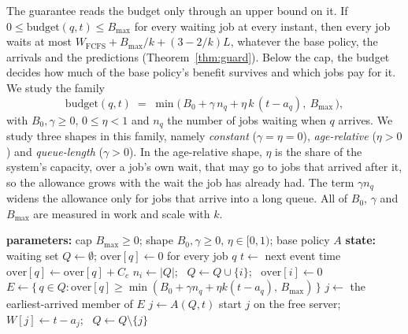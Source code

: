 The guarantee reads the budget only through an upper bound on it. If
$0 \le \mathrm{budget}(q,t) \le B_{\max}$ for every waiting job at every instant, then every
job waits at most $W_{\mathrm{FCFS}} + B_{\max}/k + (3-2/k)L$, whatever the base policy,
the arrivals and the predictions (Theorem~\ref{thm:guard}). Below the cap, the budget decides
how much of the base policy's benefit survives and which jobs pay for it. We study the
family
\begin{equation}
  \mathrm{budget}(q,t) \;=\;
  \min\bigl(\,B_0 + \gamma\,n_q + \eta\,k\,(t - a_q),\ B_{\max}\,\bigr),
  \label{eq:budget}
\end{equation}
with $B_0, \gamma \ge 0$, $0 \le \eta < 1$ and $n_q$ the number of jobs waiting when $q$
arrives. We study three shapes in this family, namely \emph{constant} ($\gamma = \eta = 0$),
\emph{age-relative} ($\eta > 0$) and \emph{queue-length} ($\gamma > 0$). In the
age-relative shape, $\eta$ is the share of the system's capacity, over a job's own wait,
that may go to jobs that arrived after it, so the allowance grows with the wait the job has
already had. The term $\gamma n_q$ widens the
allowance only for jobs that arrive into a long queue. All of $B_0$, $\gamma$ and
$B_{\max}$ are measured in work and scale with $k$.

\begin{algorithm}
\caption{Overtake-budget guard wrapped around a base policy $A$}
\label{alg:guard}
\begin{algorithmic}[1]
\State \textbf{parameters:} cap $B_{\max} \ge 0$; shape $B_0, \gamma \ge 0$, $\eta \in [0,1)$; base policy $A$
\State \textbf{state:} waiting set $Q \gets \emptyset$; $\mathrm{over}[q] \gets 0$ for every job $q$
  \State $t \gets$ next event time
   
      \State $\mathrm{over}[q] \gets \mathrm{over}[q] + C_c$
    \EndFor
  \EndFor
    \State $n_i \gets |Q|$; \ $Q \gets Q \cup \{i\}$; \ $\mathrm{over}[i] \gets 0$
  \EndFor
   
    \State $E \gets \{\, q \in Q : \mathrm{over}[q] \ge \min(B_0 + \gamma n_q + \eta k (t - a_q),\, B_{\max}) \,\}$
      \State $j \gets$ the earliest-arrived member of $E$ 
    \Else
      \State $j \gets A(Q, t)$ 
    \EndIf
    \State start $j$ on the free server; \ $W[j] \gets t - a_j$; \ $Q \gets Q \setminus \{j\}$
  \EndWhile
\EndWhile
\end{algorithmic}
\end{algorithm}


